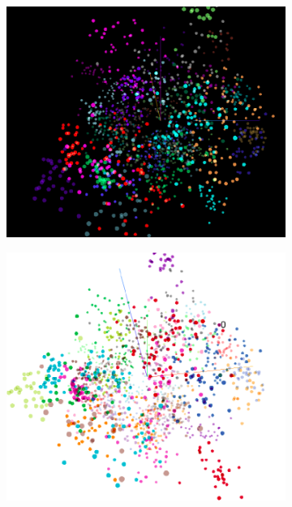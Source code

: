 \documentclass[journal, twocolumn]{IEEEtran}
\begin{document}
\begin{figure}[h!]
  \centering
  \begin{subfigure}[b]{0.5\linewidth}
    \includegraphics[width=\linewidth]{img/pca1.png}
    \caption{}
  \end{subfigure}
  \begin{subfigure}[b]{0.5\linewidth}
    \includegraphics[width=\linewidth]{img/pca2.png}
    \caption{}
  \end{subfigure}
  \begin{subfigure}[b]{0.5\linewidth}

\end{subfigure}
\end{figure}
\end{document}
